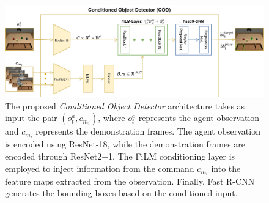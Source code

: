 \begin{figure}[t]
    \centering
    \includegraphics[width=1.0\textwidth]{figures/images/ch2/cod.jpg}
    \caption{The proposed \textit{Conditioned Object Detector} architecture takes as input the pair $(o^{a}_{t}, c_{m_{i}})$, where $o^{a}_{t}$ represents the agent observation and $c_{m_{i}}$ represents the demonstration frames. The agent observation is encoded using ResNet-18, while the demonstration frames are encoded through ResNet2+1. The FiLM conditioning layer is employed to inject information from the command $c_{m_{i}}$ into the feature maps extracted from the observation. Finally, Fast R-CNN generates the bounding boxes based on the conditioned input.}
    \label{fig:cod}
\end{figure}

